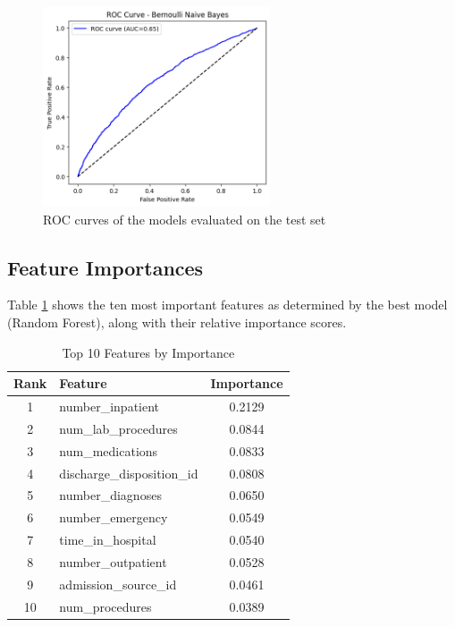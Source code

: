 \begin{figure}[h!]
    \includegraphics[width=0.6\textwidth]{images/rocNB.png}

    \caption{ROC curves of the models evaluated on the test set}
    \label{fig:cinque-immagini}
\end{figure}



\subsection{Feature Importances}

Table \ref{tab:top10_features_colored} shows the ten most important features as determined by the best model (Random Forest), along with their relative importance scores.

\begin{table}[ht]
\centering
\caption{Top 10 Features by Importance}
\label{tab:top10_features_colored}
\begin{tabular}{clc}
\toprule
\textbf{Rank} & \textbf{Feature} & \textbf{Importance} \\
\midrule
\rowcolor{red!40} 1  & number\_inpatient         & 0.2129 \\
\rowcolor{red!20} 2  & num\_lab\_procedures      & 0.0844 \\
\rowcolor{red!20} 3  & num\_medications          & 0.0833 \\
\rowcolor{red!20} 4  & discharge\_disposition\_id & 0.0808 \\
\rowcolor{orange!20} 5  & number\_diagnoses         & 0.0650 \\
\rowcolor{orange!20} 6  & number\_emergency         & 0.0549 \\
\rowcolor{orange!20} 7  & time\_in\_hospital        & 0.0540 \\
\rowcolor{orange!20} 8  & number\_outpatient        & 0.0528 \\
\rowcolor{yellow!20} 9  & admission\_source\_id     & 0.0461 \\
\rowcolor{yellow!20} 10 & num\_procedures           & 0.0389 \\
\bottomrule
\end{tabular}
\end{table}

